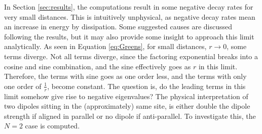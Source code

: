 \documentclass{article}
\begin{document}
\noindent
In Section \ref{sec:results}, the computations result in some negative decay rates for very small distances. This is intuitively unphysical, as negative decay rates mean an increase in energy by dissipation. Some suggested causes are discussed following the results, but it may also provide some insight to approach this limit analytically. As seen in Equation \ref{eq:Greens}, for small distances, $r \rightarrow 0$, some terms diverge. Not all terms diverge, since the factoring exponential breaks into a cosine and sine combination, and the sine effectively goes as $r$ in this limit. Therefore, the terms with sine goes as one order less, and the terms with only one order of $\frac{1}{r}$, become constant. The question is, do the leading terms in this limit somehow give rise to negative eigenvalues? The physical interpretation of two dipoles sitting in the (approximately) same site, is either double the dipole strength if aligned in parallel or no dipole if anti-parallel. To investigate this, the $N=2$ case is computed.
\end{document}
